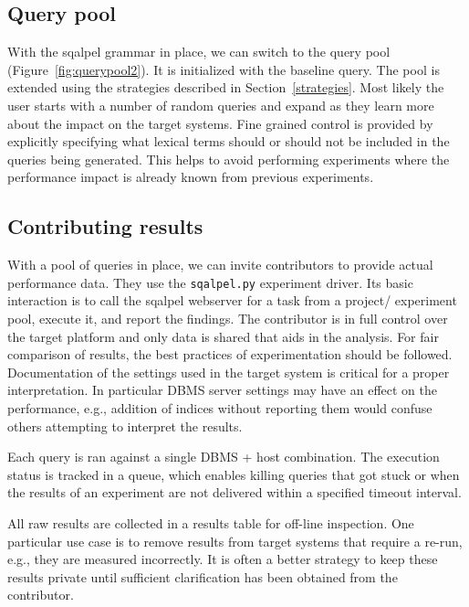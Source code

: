 \documentclass{cidr-2019}
\begin{document}
\subsection{Query pool}
With the {\sc sqalpel} grammar in place, we can switch to the query pool
(Figure~\ref{fig:querypool2}). It is initialized with the baseline
query.
The pool is extended using the strategies described in
Section~\ref{strategies}. Most likely the user starts with a number of
random queries and expand as they learn more about the impact on the
target systems. Fine grained control is provided by explicitly
specifying what lexical terms should or should not be included in the
queries being generated. This helps to avoid performing experiments
where the performance impact is already known from previous
experiments.

\subsection{Contributing results}
With a pool of queries in place, we can invite contributors to provide
actual performance data. They use the {\tt sqalpel.py} experiment
driver. Its basic interaction is to call the {\sc sqalpel} webserver
for a task from a project/ experiment pool, execute it, and report the
findings. The contributor is in full control over the target platform
and only data is shared that aids in the analysis. For fair
comparison of results, the best practices of experimentation should be
followed.
Documentation of the settings used in the target system is critical
for a proper interpretation. In particular DBMS server settings may
have an effect on the performance, e.g., addition of indices without
reporting them would confuse others attempting to interpret the
results.

Each query is ran against a single DBMS + host combination. The
execution status is tracked in a queue, which enables killing queries
that got stuck or when the results of an experiment are not delivered
within a specified timeout interval.

All raw results are collected in a results table for off-line
inspection. One particular use case is to remove results from target
systems that require a re-run, e.g., they are measured incorrectly. 
It is often a better strategy to keep these results private until
sufficient clarification has been obtained from the contributor.
\end{document}
